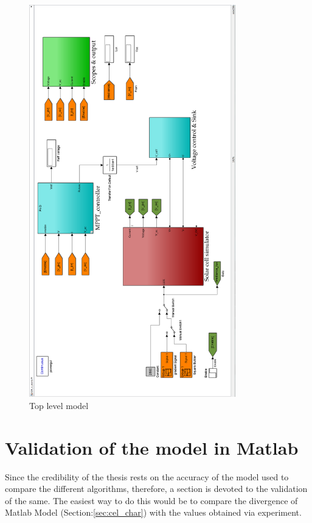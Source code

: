 \begin{figure}[H]
  \begin{center}
	  \includegraphics[width=0.8\textwidth]{images/Top_level_mod}
	  \caption{Top level model }
	  \label{fig:Model_top}
  \end{center}
\end{figure}


\section {Validation of the model in Matlab{\textregistered}}\label{sec:Validation} 

Since the credibility of the thesis rests on the accuracy of the model used to compare the different algorithms, therefore, a section is devoted to the validation of the same. The easiest way to do this would be to compare the divergence of Matlab Model (Section:\ref{sec:cel_char}) with the values obtained via experiment.\\

